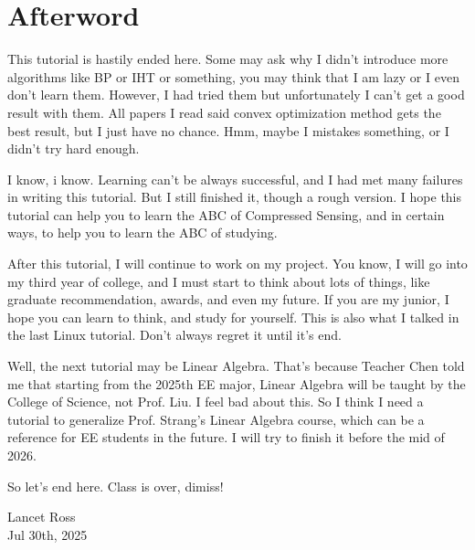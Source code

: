 \documentclass[12pt]{ctexart}
\begin{document}
\section*{\textbf{Afterword}}

This tutorial is hastily ended here. Some may ask why I didn't introduce more
algorithms like BP or IHT or something, you may think that I am lazy or I even don't
learn them. However, I had tried them but unfortunately I can't get a good result with
them. All papers I read said convex optimization method gets the best result, but I just
have no chance. Hmm,  maybe I mistakes something, or I didn't try hard enough.

I know, i know. Learning can't be always successful, and I had met many failures
in writing this tutorial. But I still finished it, though a rough version. I hope
this tutorial can help you to learn the ABC of Compressed Sensing, and in certain ways,
to help you to learn the ABC of studying.

After this tutorial, I will continue to work on my project. You know, I will go into
my third year of college, and I must start to think about lots of things, like
graduate recommendation, awards, and even my future. If you are my junior, I hope
you can learn to think, and study for yourself. This is also what I talked in the
last Linux tutorial. Don't always regret it until it's end.

Well, the next tutorial may be Linear Algebra. That's because Teacher Chen told me
that starting from the 2025th EE major, Linear Algebra will be taught by the College
of Science, not Prof. Liu. I feel bad about this. So I think I need a tutorial to
generalize Prof. Strang's Linear Algebra course, which can be a reference for
EE students in the future. I will try to finish it before the mid of 2026.

So let's end here. Class is over, dimiss!

\begin{flushright}
  Lancet Ross\\
  Jul 30th, 2025
\end{flushright}

\newpage
\end{document}
